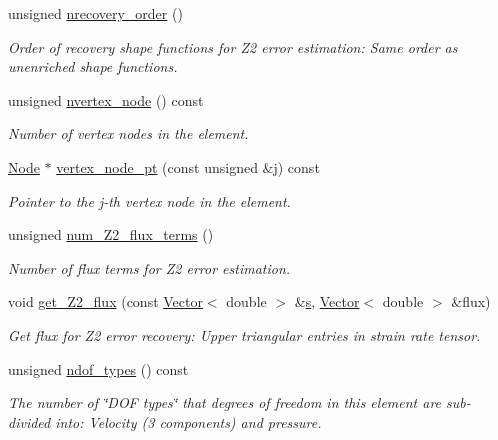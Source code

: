 \begin{DoxyCompactItemize}
unsigned \hyperlink{classoomph_1_1AxisymmetricTCrouzeixRaviartElement_a9598ee410d5f554a795fb9b8a701366e}{nrecovery\+\_\+order} ()
\begin{DoxyCompactList}\small\item\em Order of recovery shape functions for Z2 error estimation\+: Same order as unenriched shape functions. \end{DoxyCompactList}\item 
unsigned \hyperlink{classoomph_1_1AxisymmetricTCrouzeixRaviartElement_a1b5e91077a94409877b887e2f455d6da}{nvertex\+\_\+node} () const
\begin{DoxyCompactList}\small\item\em Number of vertex nodes in the element. \end{DoxyCompactList}\item 
\hyperlink{classoomph_1_1Node}{Node} $\ast$ \hyperlink{classoomph_1_1AxisymmetricTCrouzeixRaviartElement_adbace360a6641c1a5e4eda618c07a9ea}{vertex\+\_\+node\+\_\+pt} (const unsigned \&j) const
\begin{DoxyCompactList}\small\item\em Pointer to the j-\/th vertex node in the element. \end{DoxyCompactList}\item 
unsigned \hyperlink{classoomph_1_1AxisymmetricTCrouzeixRaviartElement_a4f82cf46d5bea507f5dc71112d9c8781}{num\+\_\+\+Z2\+\_\+flux\+\_\+terms} ()
\begin{DoxyCompactList}\small\item\em Number of \textquotesingle{}flux\textquotesingle{} terms for Z2 error estimation. \end{DoxyCompactList}\item 
void \hyperlink{classoomph_1_1AxisymmetricTCrouzeixRaviartElement_a7b65a77278cdf24ceac3099dc29920db}{get\+\_\+\+Z2\+\_\+flux} (const \hyperlink{classoomph_1_1Vector}{Vector}$<$ double $>$ \&\hyperlink{cfortran_8h_ab7123126e4885ef647dd9c6e3807a21c}{s}, \hyperlink{classoomph_1_1Vector}{Vector}$<$ double $>$ \&flux)
\begin{DoxyCompactList}\small\item\em Get \textquotesingle{}flux\textquotesingle{} for Z2 error recovery\+: Upper triangular entries in strain rate tensor. \end{DoxyCompactList}\item 
unsigned \hyperlink{classoomph_1_1AxisymmetricTCrouzeixRaviartElement_abc543e9ea6d95d89c87f273a365f1b39}{ndof\+\_\+types} () const
\begin{DoxyCompactList}\small\item\em The number of \char`\"{}\+D\+O\+F types\char`\"{} that degrees of freedom in this element are sub-\/divided into\+: Velocity (3 components) and pressure. \end{DoxyCompactList}\item 

\end{DoxyCompactItemize}
